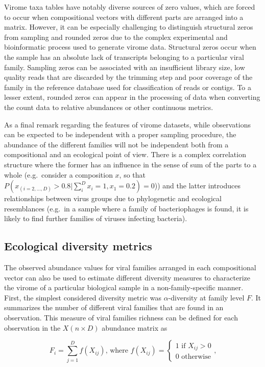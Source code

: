 \documentclass[
  openany]{book}
\begin{document}
Virome taxa tables have notably diverse sources of zero values, which are forced to occur when compositional vectors with different parts are arranged into a matrix. However, it can be especially challenging to distinguish structural zeros from sampling and rounded zeros due to the complex experimental and bioinformatic process used to generate virome data. Structural zeros occur when the sample has an absolute lack of transcripts belonging to a particular viral family. Sampling zeros can be associated with an insufficient library size, low quality reads that are discarded by the trimming step and poor coverage of the family in the reference database used for classification of reads or contigs. To a lesser extent, rounded zeros can appear in the processing of data when converting the count data to relative abundances or other continuous metrics.

As a final remark regarding the features of virome datasets, while observations can be expected to be independent with a proper sampling procedure, the abundance of the different families will not be independent both from a compositional and an ecological point of view. There is a complex correlation structure where the former has an influence in the sense of sum of the parts to a whole (e.g.~consider a composition \(x\), so that \(P( x_{(i=2,\ldots,D)} > 0.8 |\sum_i^Dx_i = 1, x_1 = 0.2) = 0\))) and the latter introduces relationships between virus groups due to phylogenetic and ecological resemblances (e.g.~in a sample where a family of bacteriophages is found, it is likely to find further families of viruses infecting bacteria).

\hypertarget{ecological-diversity-metrics}{%
\subsection{Ecological diversity metrics}\label{ecological-diversity-metrics}}

The observed abundance values for viral families arranged in each compositional vector can also be used to estimate different diversity measures to characterize the virome of a particular biological sample in a non-family-specific manner. First, the simplest considered diversity metric was \(\alpha\)-diversity at family level \(F\). It summarizes the number of different viral families that are found in an observation. This measure of viral families richness can be defined for each observation in the \(X (n \times D)\) abundance matrix as

\begin{equation} 
  F_i = \sum^D_{j=1} f(X_{ij}) \text{, where } f(X_{ij}) = \begin{cases} 1 \text{ if } X_{ij} > 0 \\ 0 \text{ otherwise} \end{cases}\text{,}
  \label{eq:richness}
\end{equation}
\end{document}
